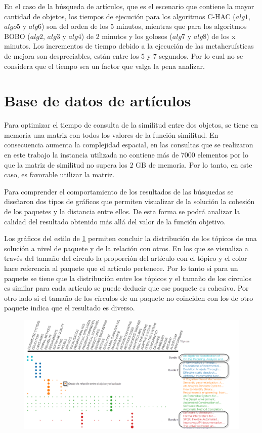 En el caso de la búsqueda de artículos, que es el escenario que contiene la mayor cantidad de objetos, los tiempos de ejecución  para los algoritmos C-HAC ($alg1$, $algo5$ y $alg6$) son del orden de los 5 minutos, mientras que para los algoritmos BOBO ($alg2$, $alg3$ y $alg4$) de 2 minutos y los golosos ($alg7$ y $alg8$) de los x minutos. Los incrementos de tiempo debido a la ejecución de las metaheruísticas de mejora son despreciables, están entre los 5 y 7 segundos. Por lo cual no se considera que el tiempo sea un factor que valga la pena analizar.

\section{Base de datos de artículos}
Para optimizar el tiempo de consulta de la similitud entre dos objetos, se tiene en memoria una matriz con todos los valores de la función similitud. En consecuencia aumenta la complejidad espacial, en las consultas que se realizaron en este trabajo la instancia utilizada no contiene más de $7000$ elementos por lo que la matriz de similitud no supera los $2$ GB de memoria. Por lo tanto, en este caso, es favorable utilizar la matriz.

Para comprender el comportamiento de los resultados de las búsquedas se diseñaron dos tipos de gráficos que permiten visualizar de la solución la cohesión de los paquetes y la distancia entre ellos. De esta forma se podrá analizar la calidad del resultado obtenido más allá del valor de la función objetivo.

Los gráficos del estilo de \ref{res:img-explain-bars} permiten concluir la distribución de los tópicos de una solución a nivel de paquete y de la relación con otros. En los que se visualiza a través del tamaño del círculo la proporción del artículo con el tópico y el color hace referencia al paquete que el artículo pertenece. Por lo tanto si para un paquete se tiene que la distribución entre los tópicos y el tamaño de los círculos es similar para cada artículo se puede deducir que ese paquete es cohesivo. Por otro lado si el tamaño de los círculos de un paquete no coinciden con los de otro paquete indica que el resultado es diverso.
\begin{figure}[H]
  \centering
    \includegraphics[width=1\textwidth]{img/explain-bars.png}
  \caption{}
  \label{res:img-explain-bars}
\end{figure}

